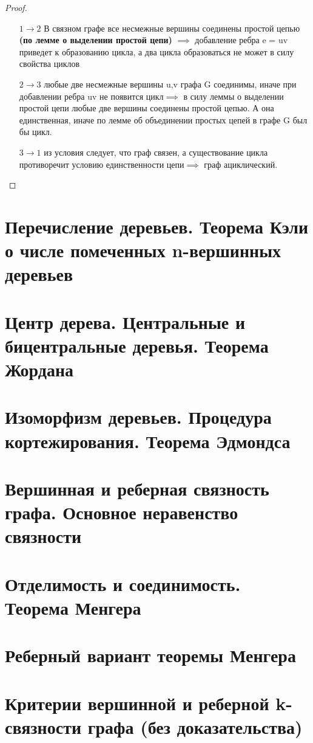 \documentclass[a4paper]{article}
\theoremstyle{definition}
\theoremstyle{remark}
\begin{document}
    \begin{proof}
        \begin{itemize}
            \item[$1\to 2$] В связном графе все несмежные вершины соединены простой цепью \textbf{(по лемме о выделении простой цепи)}
            $\implies$ добавление ребра e = uv приведет к образованию цикла, а два цикла образоваться не может в силу свойства циклов
            \item[$2 \to 3$] любые две несмежные вершины u,v графа G соединимы, иначе при добавлении ребра uv не появится цикл$\implies$
            в силу леммы о выделении простой цепи любые две вершины соединены простой цепью. А она единственная, иначе по лемме об 
            объединении простых цепей в графе G был бы цикл.
            \item[$3\to1$]из условия следует, что граф связен, а существование цикла противоречит условию единственности цепи$\implies$
            граф ациклический.
        \end{itemize}
    \end{proof}
    \section{Перечисление деревьев. Теорема Кэли о числе помеченных n-вершинных деревьев}
    \section{Центр дерева. Центральные и бицентральные деревья. Теорема Жордана}
    \section{Изоморфизм деревьев. Процедура кортежирования. Теорема Эдмондса}
    \section{Вершинная и реберная связность графа. Основное неравенство связности}
    \section{Отделимость и соединимость. Теорема Менгера}
    \section{Реберный вариант теоремы Менгера}
    \section{Критерии вершинной и реберной k-связности графа (без доказательства)}
\end{document}
